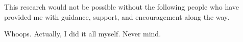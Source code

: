 
\begin{acknowledgments}
This research would not be possible without the following people who have
provided me with guidance, support, and encouragement along the way.

Whoops. Actually, I did it all myself. Never mind.

\end{acknowledgments}
